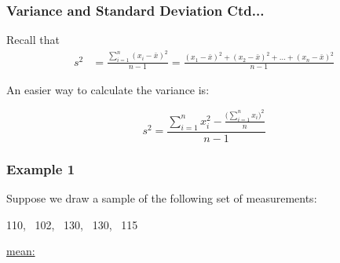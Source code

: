 \documentclass[xcolor=svgnames, compress]{beamer}
\newcommand*\circled[1]{\tikz[baseline=(char.base)]{
            \node[shape=circle,draw,inner sep=2pt] (char) {#1};}}
\begin{document}

\begin{frame}
\frametitle{Variance and Standard Deviation Ctd...} 


Recall that
	\begin{align*}
	s^{2} & = \frac{ \displaystyle\sum_{i=1}^{n} (x_{i} - \bar{x})^{2} }{n - 1}  = \frac{ (x_{1} - \bar{x})^{2} +  (x_{2} - \bar{x})^{2} + \ldots + (x_{n} - \bar{x})^{2} }{n-1}  %
	\end{align*}

\vspace{0.25cm}
An easier way to calculate the variance is:

\begin{equation*}
	s^{2} =  \frac{ \displaystyle\sum_{i=1}^{n} x_{i}^2 -  \frac{ \bigg( \displaystyle\sum_{i=1}^{n} x_{i} \bigg)^{2} }{n} }{n - 1} %
\end{equation*}


\end{frame}






\begin{frame}[t]
\frametitle{Example 1} 

\vspace{-0.25cm}
Suppose we draw a sample of the following set of measurements:
\begin{center}
110, ~102, ~130, ~130, ~115
\end{center}

\underline{mean:}


\end{frame}



\end{document}
